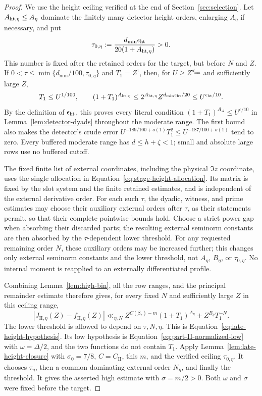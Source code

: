 \begin{proof}
We use the height ceiling verified at the end of
Section~\ref{sec:selection}.  Let \(A_{{\rm ht},\eta}\le A_\eta\)
dominate the finitely many detector height orders, enlarging \(A_\eta\)
if necessary, and put
\[
 \tau_{0,\eta}:=
       \frac{d_{\min}\epsilon_{\rm ht}}{20(1+A_{{\rm ht},\eta})}>0.
\]
This number is fixed after the retained orders for the target, but before
\(N\) and \(Z\).  If
\(0<\tau\le\min\{d_{\min}/100,\tau_{0,\eta}\}\) and \(T_1=Z^\tau\),
then, for \(U\ge Z^{d_{\min}}\) and sufficiently large \(Z\),
\[
 T_1\le U^{1/100},\qquad
 (1+T_1)^{A_{{\rm ht},\eta}}
 \le2^{A_{{\rm ht},\eta}}Z^{d_{\min}\epsilon_{\rm ht}/20}
 \le U^{\epsilon_{\rm ht}/10}.
\]
By the definition of \(\epsilon_{\rm ht}\), this proves every literal
condition \((1+T_1)^{A_{\mathcal A}}\le U^{\epsilon/10}\) in
Lemma~\ref{lem:detector-dyads} throughout the moderate range.  The first
bound also
makes the detector's crude error
\(U^{-189/100+o(1)}T_1^2\le U^{-187/100+o(1)}\) tend to zero.
Every buffered moderate range has \(d\le h+\zeta<1\); small and
absolute large rows use no buffered cutoff.

The fixed finite list of external coordinates, including the physical
\(\Im z\) coordinate, uses the single allocation in
Equation~\eqref{eq:stage-height-allocation}.  Its matrix is fixed by the
slot system and the finite retained estimates, and is independent of the
external derivative order.  For each such \(\tau\), the dyadic, witness,
and prime estimates may choose their auxiliary external orders after
\(\tau\), as their statements permit, so that their complete pointwise
bounds hold.  Choose a strict power gap when absorbing their discarded
parts; the resulting external seminorm constants are then absorbed by the
\(\tau\)-dependent lower threshold.  For any requested remaining order
\(N\), these auxiliary
orders may be increased further; this changes only external seminorm
constants and the lower threshold, not \(A_\eta\), \(B_\eta\), or
\(\tau_{0,\eta}\).  No internal moment is reapplied to an externally
differentiated profile.

Combining Lemma~\ref{lem:high-bin}, all the row ranges, and the principal
remainder estimate therefore gives, for every fixed \(N\) and sufficiently
large \(Z\) in this ceiling range,
\[
 |J_{\mathrm{II},\eta}(Z)-f_{\mathrm{II},\eta}(Z)|
 \ll_{\eta,N}
 Z^{C(\beta_*)-m}(1+T_1)^{A_\eta}
       +Z^{B_\eta}T_1^{-N}.
\]
The lower threshold is allowed to depend on \(\tau,N,\eta\).
This is Equation~\eqref{eq:late-height-hypothesis}.
Its low hypothesis is Equation~\eqref{eq:part-II-normalized-low}
with \(\omega=\Delta/2\), and the two functions do not contain \(T_1\).
Apply Lemma~\ref{lem:late-height-closure} with
\(\sigma_0=7/8\), \(C=C_{\mathrm{II}}\), this \(m\), and the verified
ceiling \(\tau_{0,\eta}\).  It chooses \(\tau_\eta\), then a common
dominating external order \(N_\eta\), and finally the threshold.
It gives the asserted high estimate with \(\sigma=m/2>0\).
Both \(\omega\) and \(\sigma\) were fixed before the target.
\end{proof}

